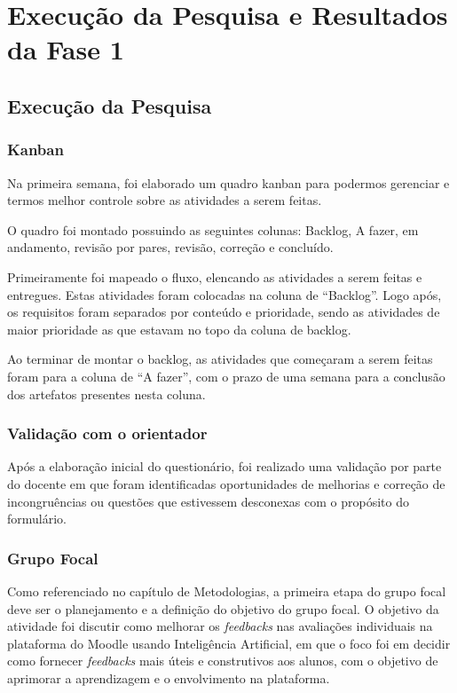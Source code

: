 \chapter{Execução da Pesquisa e Resultados da Fase 1}

\section{Execução da Pesquisa}

\subsection{Kanban}

Na primeira semana, foi elaborado um quadro kanban para podermos gerenciar e termos melhor controle sobre as atividades a serem feitas.

O quadro foi montado possuindo as seguintes colunas: Backlog, A fazer, em andamento, revisão por pares, revisão, correção e concluído.

Primeiramente foi mapeado o fluxo, elencando as atividades a serem feitas e entregues. Estas atividades foram colocadas na coluna de ``Backlog''. Logo após, os requisitos foram separados por conteúdo e prioridade, sendo as atividades de maior prioridade as que estavam no topo da coluna de backlog.

Ao terminar de montar o backlog, as atividades que começaram a serem feitas foram para a coluna de ``A fazer'', com o prazo de uma semana para a conclusão dos artefatos presentes nesta coluna.

\subsection{Validação com o orientador}

Após a elaboração inicial do questionário, foi realizado uma validação por parte do docente em que foram identificadas oportunidades de melhorias e correção de incongruências ou questões que estivessem desconexas com o propósito do formulário.

\subsection{Grupo Focal}

Como referenciado no capítulo de Metodologias, a primeira etapa do grupo focal deve ser o planejamento e a definição do objetivo do grupo focal. O objetivo da atividade foi discutir como melhorar os \textit{feedbacks} nas avaliações individuais na plataforma do Moodle usando Inteligência Artificial, em que o foco foi em decidir como fornecer \textit{feedbacks} mais úteis e construtivos aos alunos, com o objetivo de aprimorar a aprendizagem e o envolvimento na plataforma.

